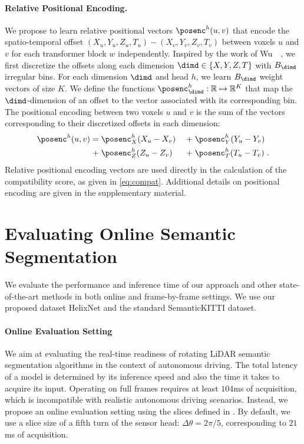 \documentclass[runningheads]{tpls/llncs}
\begin{document}
\paragraph{Relative Positional Encoding.} We propose to learn relative positional vectors $\posenc^{h}(u, v)$ that encode the spatio-temporal offset $(X_u, Y_u, Z_u, T_u)-(X_v, Y_v, Z_v, T_v)$ between voxels $u$ and $v$ for each transformer block $w$ independently. Inspired by the work of Wu~\etal~\cite{wu2021rethinking}, we first discretize the offsets along each dimension $\dimd \in \{X,Y,Z,T\}$ with $B_\dimd$ irregular bins. For each dimension $\dimd$ and head $h$, we learn $B_\dimd$ weight vectors of size $K$. We define the functions $\posenc^{h}_\dimd:\mathbb{R}\mapsto\mathbb{R}^K$ that map the $\dimd$-dimension of an offset to the vector associated with its corresponding bin. The positional encoding between two voxels $u$ and $v$ is the sum of the vectors corresponding to their discretized offsets in each dimension:
\begin{alignat}{4}\nonumber
        \posenc^{h}(u, v)
        =&\;\posenc^{h}_X(X_u-X_v)
        &\;+\;&\posenc^{h}_Y(Y_u-Y_v)\\
        +&\;\posenc^{h}_Z(Z_u-Z_v)
        &\;+\;&\posenc^{h}_T(T_u-T_v)~.
\end{alignat}
Relative positional encoding vectors are used directly in the calculation of the compatibility score, as given in \eqref{eq:compat}.
Additional details on positional encoding are given in the supplementary material.%
 \section{Evaluating Online Semantic Segmentation}\label{sec:experiments}
We evaluate the performance and inference time of our approach and other state-of-the-art methods in both online and frame-by-frame settings. We use our proposed dataset HelixNet and the standard SemanticKITTI dataset.

\paragraph{Online Evaluation Setting}
We aim at evaluating the real-time readiness of rotating LiDAR semantic segmentation algorithms in the context of autonomous driving. The total latency of a model is determined by its inference speed and also the time it takes to acquire its input. Operating on full frames requires at least $104$ms of acquisition, which is incompatible with realistic autonomous driving scenarios. Instead, we propose an online evaluation setting using the slices defined in . By default, we use a slice size of a fifth turn of the sensor head: $\Delta \theta = 2\pi/5$, corresponding to $21$ms of acquisition.
\end{document}
